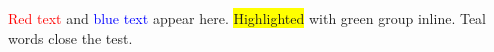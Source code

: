 \documentclass{article}
\begin{document}
\textcolor{red}{Red text} and \textcolor{blue}{blue text} appear here.
\colorbox{yellow}{Highlighted} with {\color{green}green group} inline.
\textcolor{teal2}{Teal words close the test.}
\end{document}

